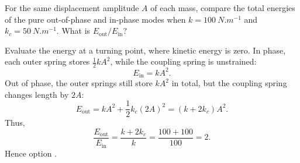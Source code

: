 \begin{quizquestion}[
  id=phy104-nm-049,
  topic=normal-modes,
  difficulty=challenge,
  marks=3,
  correct=A,
  tags={coupled-oscillators,modal-energy,energy-ratio},
  outcome={Compare energies of two pure normal modes}
]
  For the same displacement amplitude \(A\) of each mass, compare the total energies of the pure out-of-phase and in-phase modes when \(k=\SI{100}{N.m^{-1}}\) and \(k_c=\SI{50}{N.m^{-1}}\). What is \(E_{\mathrm{out}}/E_{\mathrm{in}}\)?
\end{quizquestion}
\begin{quizsolution}
  Evaluate the energy at a turning point, where kinetic energy is zero. In phase, each outer spring stores \(\tfrac12kA^2\), while the coupling spring is unstrained:
    \[
      E_{\mathrm{in}}=kA^2.
    \]
    Out of phase, the outer springs still store \(kA^2\) in total, but the coupling spring changes length by \(2A\):
    \[
      E_{\mathrm{out}}=kA^2+\frac12k_c{(2A)}^2={(k+2k_c)}A^2.
    \]
    Thus,
    \[
      \frac{E_{\mathrm{out}}}{E_{\mathrm{in}}}=\frac{k+2k_c}{k}=\frac{100+100}{100}=2.
    \]
    Hence option \textbf{\quizcorrectletter}.
\end{quizsolution}


